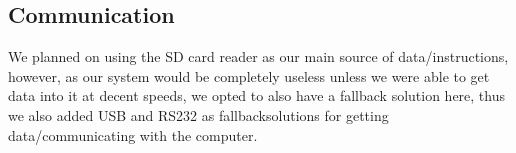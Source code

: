 \subsection {Communication}
We planned on using the \ac{SD} card reader as our main source of data/instructions, however, as our system would
be completely useless unless we were able to get data into it at decent speeds,
we opted to also have a fallback solution
here, thus we also added \ac{USB} and RS232 as fallbacksolutions for getting data/communicating with the computer.

